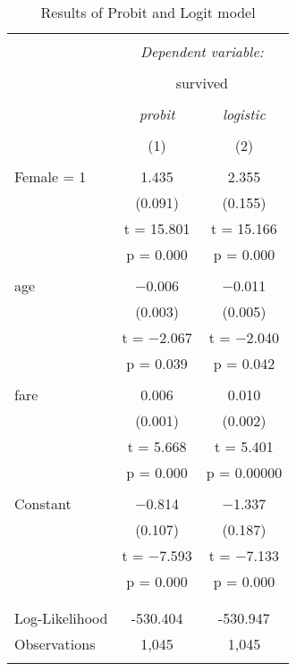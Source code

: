 \documentclass[
  12pt,
]{article}
\begin{document}
\begin{table}[h] \centering 
  \caption{Results of Probit and Logit model} 
  \label{probit_logit} 
\small 
\begin{tabular}{@{\extracolsep{5pt}}lcc} 
\\[-1.8ex]\hline 
\hline \\[-1.8ex] 
 & \multicolumn{2}{c}{\textit{Dependent variable:}} \\ 
\cline{2-3} 
\\[-1.8ex] & \multicolumn{2}{c}{survived} \\ 
\\[-1.8ex] & \textit{probit} & \textit{logistic} \\ 
\\[-1.8ex] & (1) & (2)\\ 
\hline \\[-1.8ex] 
 Female = 1 & 1.435 & 2.355 \\ 
  & (0.091) & (0.155) \\ 
  & t = 15.801 & t = 15.166 \\ 
  & p = 0.000 & p = 0.000 \\ 
  & & \\ 
 age & $-$0.006 & $-$0.011 \\ 
  & (0.003) & (0.005) \\ 
  & t = $-$2.067 & t = $-$2.040 \\ 
  & p = 0.039 & p = 0.042 \\ 
  & & \\ 
 fare & 0.006 & 0.010 \\ 
  & (0.001) & (0.002) \\ 
  & t = 5.668 & t = 5.401 \\ 
  & p = 0.000 & p = 0.00000 \\ 
  & & \\ 
 Constant & $-$0.814 & $-$1.337 \\ 
  & (0.107) & (0.187) \\ 
  & t = $-$7.593 & t = $-$7.133 \\ 
  & p = 0.000 & p = 0.000 \\ 
  & & \\ 
\hline \\[-1.8ex] 
Log-Likelihood & -530.404 & -530.947 \\ 
Observations & 1,045 & 1,045 \\ 
\hline 
\hline \\[-1.8ex] 
\end{tabular} 
\end{table}
\end{document}
